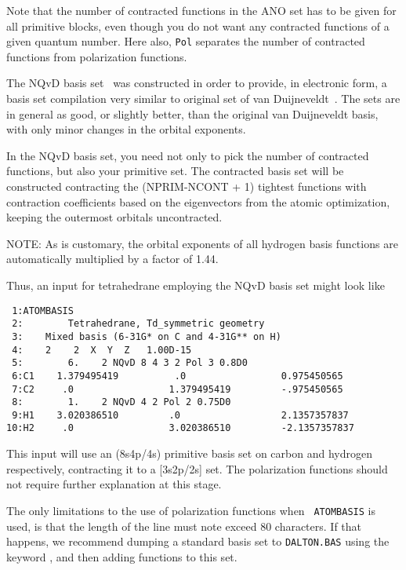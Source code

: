 Note that the number of contracted functions in the ANO
set has to be
given for all primitive blocks, even though you do not want any
contracted functions of a given quantum number. Here also, {\tt Pol}
separates the number of contracted functions from polarization
functions.

The NQvD basis set~\cite{nqvdref} was constructed in order to provide,
in electronic form, a basis set compilation very similar to original
set of van Duijneveldt~\cite{fbvdibmrap}.
The sets are in general as good, or slightly better, than the original
van Duijneveldt basis, with only minor changes in the orbital
exponents.

In the NQvD basis set, you need not only to pick the number of
contracted functions, but also your primitive set. The contracted
basis set will be constructed contracting the (NPRIM-NCONT + 1)
tightest functions with contraction coefficients based on the
eigenvectors from the atomic optimization, keeping the outermost
orbitals uncontracted.

NOTE: As is customary, the orbital exponents of all hydrogen basis
functions are automatically multiplied by a factor of 1.44.

Thus, an input for tetrahedrane employing the NQvD basis set might
look like

\begin{verbatim}
 1:ATOMBASIS
 2:        Tetrahedrane, Td_symmetric geometry
 3:    Mixed basis (6-31G* on C and 4-31G** on H)
 4:    2    2  X  Y  Z   1.00D-15
 5:        6.    2 NQvD 8 4 3 2 Pol 3 0.8D0
 6:C1    1.379495419          .0                 0.975450565
 7:C2     .0                 1.379495419         -.975450565
 8:        1.    2 NQvD 4 2 Pol 2 0.75D0
 9:H1    3.020386510         .0                  2.1357357837
10:H2     .0                 3.020386510         -2.1357357837
\end{verbatim}

This input will use an (8s4p/4s) primitive basis set on carbon and
hydrogen respectively, contracting it to a [3s2p/2s] set. The
polarization functions should not require further explanation at this
stage.

The only limitations to the use of polarization functions when {\tt
ATOMBASIS} is used, is that the length of the line must note exceed 80
characters. If that happens, we recommend dumping a standard basis set
to \verb|DALTON.BAS| using the keyword , and then adding
functions to this set.

